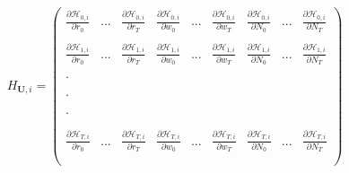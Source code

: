 \documentclass[titlepage]{\econtex}\providecommand{\texname}{BufferStockTheory}
\begin{document}
 
 $$ H_{\mathbf{U}, i}= \begin{pmatrix} 
\frac{ \partial \mathcal{H}_{0,i}}{\partial r_{0}}  & ... & \frac{ \partial \mathcal{H}_{0,i}}{\partial r_{T}} & \frac{ \partial \mathcal{H}_{0,i}}{\partial w_{0}} & ... & \frac{ \partial \mathcal{H}_{0,i}}{\partial w_{T}} & \frac{ \partial \mathcal{H}_{0,i}}{\partial N_{0}} & ... &\frac{ \partial \mathcal{H}_{0,i}}{\partial N_{T}} \\ \\ 
\frac{ \partial \mathcal{H}_{1,i}}{\partial r_{0}}  & ... & \frac{ \partial \mathcal{H}_{1,i}}{\partial r_{T}} & \frac{ \partial \mathcal{H}_{1,i}}{\partial w_{0}} & ... & \frac{ \partial \mathcal{H}_{1,i}}{\partial w_{T}} & \frac{ \partial \mathcal{H}_{1,i}}{\partial N_{0}} & ... &\frac{ \partial \mathcal{H}_{1,i}}{\partial N_{T}}  \\ \\
.   \\ \\ \\ 
. \\ \\ \\
. \\ \\ \\
\frac{ \partial \mathcal{H}_{T,i}}{\partial r_{0}}  & ... & \frac{ \partial \mathcal{H}_{T,i}}{\partial r_{T}} & \frac{ \partial \mathcal{H}_{T,i}}{\partial w_{0}} & ... & \frac{ \partial \mathcal{H}_{T,i}}{\partial w_{T}} & \frac{ \partial \mathcal{H}_{T,i}}{\partial N_{0}} & ... &\frac{ \partial \mathcal{H}_{T,i}}{\partial N_{T}} \\ \\
 \end{pmatrix} $$ \\
 
\end{document}
